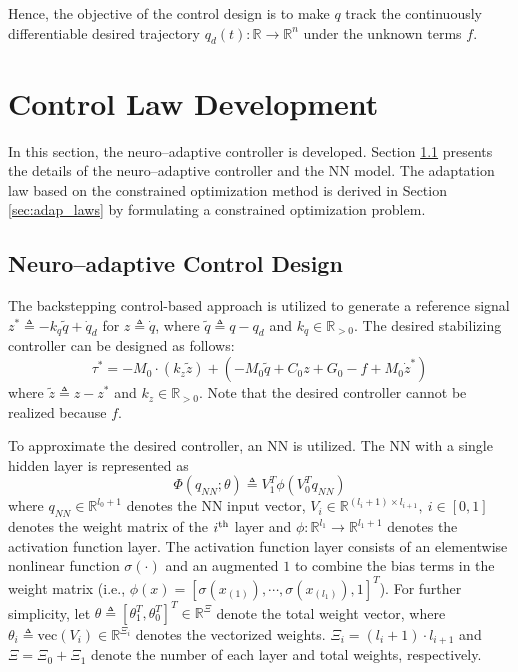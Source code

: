\documentclass[letterpaper, 10 pt, conference]{ieeeconf}  %
\begin{document}
Hence, the objective of the control design is to make $q$ track the continuously differentiable desired trajectory $q_d(t):\mathbb R\to \mathbb R^n$ under the unknown terms $f$.

\section{Control Law Development}\label{sec:ctrl design}

In this section, the neuro–adaptive controller is developed.
Section \ref{sec:ctrl dev} presents the details of the neuro–adaptive controller and the NN model.
The adaptation law based on the constrained optimization method is derived in Section \ref{sec:adap_laws} by formulating a constrained optimization problem.

\subsection{Neuro–adaptive Control Design} \label{sec:ctrl dev}


The backstepping control-based approach is utilized to generate a reference signal $z^*\triangleq -{k_q}\tilde q+\dot q_d$ for ${z}\triangleq \dot q$, where $\tilde q\triangleq {q} - q_d$ and $k_q\in\mathbb R_{>0}$.
The desired stabilizing controller can be designed as follows:
\begin{equation}
    \tau^* = -M_0\cdot ({k_z}\tilde z)+ 
        ( 
            -M_0\tilde q+C_0{z}+G_0-f+M_0 \dot z^*
        )
    \label{eq. desired control}
\end{equation}
where $\tilde z\triangleq z-z^*$ and $k_z\in\mathbb R_{>0}$.
Note that the desired controller cannot be realized because $f$.

To approximate the desired controller, an NN is utilized.
The NN with a single hidden layer is represented as 
\begin{equation*}
    \Phi({q_{NN}};\theta)\triangleq V_1^T\phi(V_0^T{q_{NN}})
\end{equation*}
where ${q_{NN}}\in\mathbb R^{l_0+1}$ denotes the NN input vector, $V_i\in\mathbb R^{(l_i+1)\times l_{i+1}},\ i\in[0,1]$ denotes the weight matrix of the $i\textsuperscript{th}$ layer and $\phi:\mathbb R^{l_1}\to\mathbb R^{l_1+1}$ denotes the activation function layer.
The activation function layer consists of an elementwise nonlinear function $\sigma(\cdot)$ and an augmented $1$ to combine the bias terms in the weight matrix (i.e., $\phi(x) = [\sigma(x_{(1)}),\cdots, \sigma(x_{(l_1)}), 1]^T$).
For further simplicity, let $\theta\triangleq[\theta_1^T,\theta_0^T]^T\in\mathbb R^{\Xi}$ denote the total weight vector, where $\theta_i\triangleq \text{vec}(V_i)\in\mathbb R^{\Xi_i}$ denotes the vectorized weights.
$\Xi_i=(l_i+1)\cdot l_{i+1}$ and $\Xi=\Xi_0+\Xi_1$ denote the number of each layer and total weights, respectively.
\end{document}
